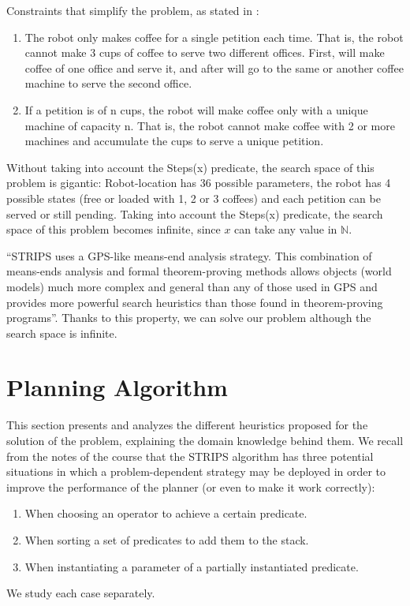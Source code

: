\documentclass[12pt,a4paper,oneside]{article}
\numberwithin{equation}{section}
\numberwithin{equation}{section}
\theoremstyle{definition}
\begin{document}
Constraints that simplify the problem, as stated in \cite{problemdefinition}:
\begin{enumerate}
	\item The robot only makes coffee for a single petition each time. That is, the robot cannot make 3 cups of coffee to serve two different offices. First, will make coffee of one office and serve it, and after will go to the same or another coffee machine to serve the second office.
	\item If a petition is of n cups, the robot will make coffee only with a unique machine of capacity n. That is, the robot cannot make coffee with 2 or more machines and accumulate the cups to serve a unique petition.
\end{enumerate}


Without taking into account the Steps(x) predicate, the search space of this problem is gigantic: Robot-location has 36 possible parameters, the robot has 4 possible states (free or loaded with 1, 2 or 3 coffees) and each petition can be served or still pending. Taking into account the Steps(x) predicate, the search space of this problem becomes infinite, since $x$ can take any value in $\mathbb{N}$.


“STRIPS uses a GPS-like means-end analysis strategy\cite{gps}. This combination of means-ends analysis and formal theorem-proving methods allows objects (world models) much more complex and general than any of those used in GPS and provides more powerful search heuristics than those found in theorem-proving programs”\cite{strips}. Thanks to this property, we can solve our problem although the search space is infinite.



\section{Planning Algorithm} \label{Planning Algorithm}

This section presents and analyzes the different heuristics proposed for the solution of the problem, explaining the domain knowledge behind them. We recall from the notes of the course\cite{notes} that the STRIPS algorithm has three potential situations in which a problem-dependent strategy may be deployed in order to improve the performance of the planner (or even to make it work correctly):
\begin{enumerate}
	\item When choosing an operator to achieve a certain predicate.
	\item When sorting a set of predicates to add them to the stack.
	\item When instantiating a parameter of a partially instantiated predicate.
\end{enumerate}
We study each case separately.
\end{document}
